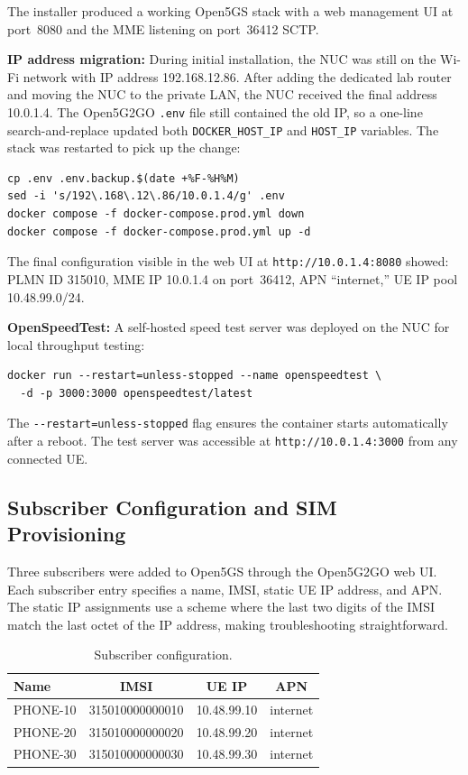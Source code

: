 \documentclass[
    left=1.5in,
    right=1.25in,
    top=1.25in,
    bottom=1.25in
]{CalPolySeniorProject}
\begin{document}
The installer produced a working Open5GS stack with a web management UI at
port~8080 and the MME listening on port~36412 SCTP.

\textbf{IP address migration:} During initial installation, the NUC was still on
the Wi-Fi network with IP address 192.168.12.86. After adding the dedicated lab
router and moving the NUC to the private LAN, the NUC received the final address
10.0.1.4. The Open5G2GO \texttt{.env} file still contained the old IP, so a
one-line search-and-replace updated both \texttt{DOCKER\_HOST\_IP} and
\texttt{HOST\_IP} variables. The stack was restarted to pick up the change:

\begin{verbatim}
cp .env .env.backup.$(date +%F-%H%M)
sed -i 's/192\.168\.12\.86/10.0.1.4/g' .env
docker compose -f docker-compose.prod.yml down
docker compose -f docker-compose.prod.yml up -d
\end{verbatim}

The final configuration visible in the web UI at \texttt{http://10.0.1.4:8080}
showed: PLMN ID 315010, MME IP 10.0.1.4 on port~36412, APN ``internet,'' UE IP
pool 10.48.99.0/24.

\textbf{OpenSpeedTest:} A self-hosted speed test server was deployed on the NUC
for local throughput testing:

\begin{verbatim}
docker run --restart=unless-stopped --name openspeedtest \
  -d -p 3000:3000 openspeedtest/latest
\end{verbatim}

The \texttt{-{}-restart=unless-stopped} flag ensures the container starts
automatically after a reboot. The test server was accessible at
\texttt{http://10.0.1.4:3000} from any connected UE.

\subsection{Subscriber Configuration and SIM Provisioning}

Three subscribers were added to Open5GS through the Open5G2GO web UI. Each
subscriber entry specifies a name, IMSI, static UE IP address, and APN. The
static IP assignments use a scheme where the last two digits of the IMSI match
the last octet of the IP address, making troubleshooting straightforward.

\begin{table}[!ht]
    \centering
    \caption[Subscriber configuration]{Subscriber configuration.}
    \vspace{0.5\baselineskip}
    \begin{tabular}{lccc}
        \toprule
        \textbf{Name} & \textbf{IMSI} & \textbf{UE IP} & \textbf{APN} \\
        \midrule
        PHONE-10 & 315010000000010 & 10.48.99.10 & internet \\
        PHONE-20 & 315010000000020 & 10.48.99.20 & internet \\
        PHONE-30 & 315010000000030 & 10.48.99.30 & internet \\
        \bottomrule
    \end{tabular}
    \label{tab:subscribers}
\end{table}
\end{document}
